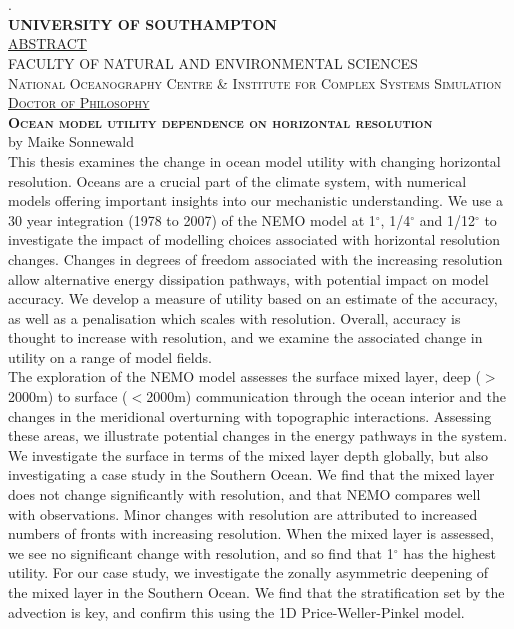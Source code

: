 \documentclass[a4paper,12pt, openright, titlepage]{book}
\begin{document}
\frontmatter
\chapter[Abstract]{ }
. \\[-5.51cm]
\textsc{ \textbf{\textsc{UNIVERSITY OF SOUTHAMPTON}}}\\ 
\textsc{\large \uline{ABSTRACT}}\\[0.1cm]

\textsc{\small FACULTY OF NATURAL AND ENVIRONMENTAL SCIENCES}\\[0.05cm] 
\textsc{\footnotesize National Oceanography Centre \& Institute for Complex Systems Simulation}\\[0.05cm]
\textsc{\uline{Doctor of Philosophy}}\\[0.1cm]

\textbf{\textsc{\large Ocean model utility dependence on horizontal resolution}}\\[0.01cm]
{by Maike Sonnewald}\\[0.2cm]
\justify
\linespread{1}
This thesis examines the change in ocean model utility with changing horizontal resolution. Oceans are a crucial part of the climate system, with numerical models offering important insights into our mechanistic understanding. We use a 30 year integration (1978 to 2007) of the NEMO model at 1$^{\circ}$, 1/4$^{\circ}$ and 1/12$^{\circ}$ to investigate the impact of modelling choices associated with horizontal resolution changes. Changes in degrees of freedom associated with the increasing resolution allow alternative energy dissipation pathways, with potential impact on model accuracy. We develop a measure of utility based on an estimate of the accuracy, as well as a penalisation which scales with resolution. Overall, accuracy is thought to increase with resolution, and we examine the associated change in utility on a range of model fields. \\

The exploration of the NEMO model assesses the surface mixed layer, deep ($>$2000m) to surface ($<$2000m) communication through the ocean interior and the changes in the meridional overturning with topographic interactions. Assessing these areas, we illustrate potential changes in the energy pathways in the system. We investigate the surface in terms of the mixed layer depth globally, but also investigating a case study in the Southern Ocean. We find that the mixed layer does not change significantly with resolution, and that NEMO compares well with observations. Minor changes with resolution are attributed to increased numbers of fronts with increasing resolution. When the mixed layer is assessed, we see no significant change with resolution, and so find that 1$^{\circ}$ has the highest utility. For our case study, we investigate the zonally asymmetric deepening of the mixed layer in the Southern Ocean. We find that the stratification set by the advection is key, and confirm this using the 1D Price-Weller-Pinkel model.\\
\end{document}
